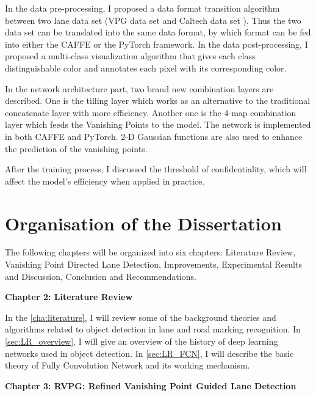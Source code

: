\begin{spacing}{1.5}
In the data pre-processing, I proposed a data format transition algorithm between two lane data set (VPG data set \cite{lee2017vpgnet} and Caltech data set \cite{aly2008real}). Thus the two data set can be translated into the same data format, by which format can be fed into either the CAFFE or the PyTorch framework. In the data post-processing, I proposed a multi-class visualization algorithm that gives each class distinguishable color and annotates each pixel with its corresponding color.

In the network architecture part, two brand new combination layers are described. One is the tilling layer which works as an alternative to the traditional concatenate layer with more efficiency. Another one is the 4-map combination layer which feeds the Vanishing Points to the model. The network is implemented in both CAFFE and PyTorch. 2-D Gaussian functions are also used to enhance the prediction of the vanishing points.

After the training process, I discussed the threshold of confidentiality, which will affect the model's efficiency when applied in practice.

\section{Organisation of the Dissertation}
\label{sec:IN_organisation}

The following chapters will be organized into six chapters: Literature Review, Vanishing Point Directed Lane Detection, Improvements, Experimental Results and Discussion, Conclusion and Recommendations.

{\large\textbf{Chapter 2: Literature Review}}

In the \autoref{cha:literature}, I will review some of the background theories and algorithms related to object detection in lane and road marking recognition. In \autoref{sec:LR_overview}, I will give an overview of the history of deep learning networks used in object detection. In \autoref{sec:LR_FCN}, I will describe the basic theory of Fully Convolution Network and its working mechanism. 

{\large\textbf{Chapter 3: RVPG: Refined Vanishing Point Guided Lane Detection}}


\end{spacing}

